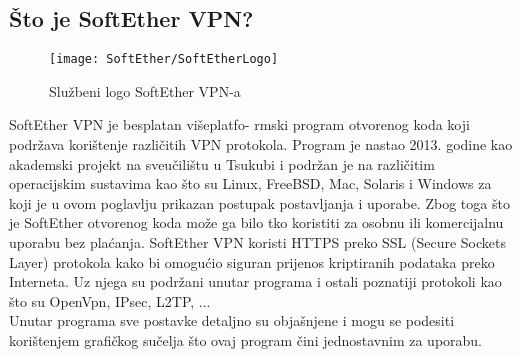 \bigbreak
\subsection*{Što je SoftEther VPN?}

\begin{wrapfigure}{r}{0.5\textwidth} 
     \centering
     \texttt{[image: SoftEther/SoftEtherLogo]}
	\caption{Službeni logo SoftEther VPN-a}
\end{wrapfigure}
\hspace{0.5cm}
SoftEther VPN je besplatan višeplatfo- rmski program otvorenog koda koji podržava korištenje različitih VPN protokola. Program je nastao 2013. godine kao akademski projekt na sveučilištu u Tsukubi i podržan je na različitim operacijskim sustavima kao što su Linux, FreeBSD, Mac, Solaris i Windows za koji je u ovom poglavlju prikazan postupak postavljanja i uporabe.
\smallbreak
Zbog toga što je SoftEther otvorenog koda može ga bilo tko koristiti za osobnu ili komercijalnu uporabu bez plaćanja. 
\smallbreak
SoftEther VPN koristi HTTPS preko SSL (Secure Sockets Layer) %
protokola kako bi omogućio siguran prijenos kriptiranih podataka preko Interneta. Uz njega su podržani unutar programa i ostali poznatiji protokoli kao što su OpenVpn, IPsec, L2TP, ...\\
Unutar programa sve postavke detaljno su objašnjene i mogu se podesiti korištenjem grafičkog sučelja što ovaj program čini jednostavnim za uporabu.

\FloatBarrier

\bigbreak
